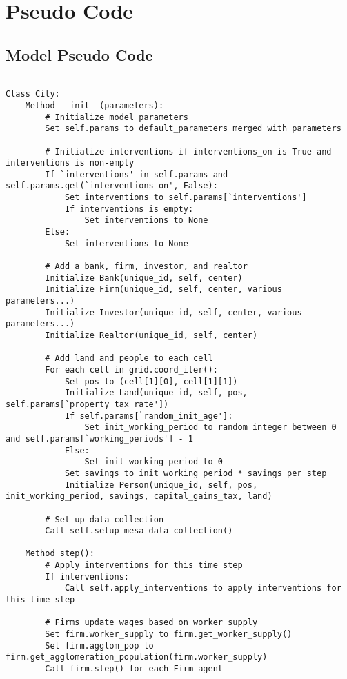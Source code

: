 \chapter{Pseudo Code} \label{appendix-pseudocode}
\section{Model Pseudo Code}
{\tiny\begin{verbatim} 

Class City:
    Method __init__(parameters):
        # Initialize model parameters
        Set self.params to default_parameters merged with parameters

        # Initialize interventions if interventions_on is True and interventions is non-empty
        If `interventions' in self.params and self.params.get(`interventions_on', False):
            Set interventions to self.params[`interventions']
            If interventions is empty:
                Set interventions to None
        Else:
            Set interventions to None

        # Add a bank, firm, investor, and realtor
        Initialize Bank(unique_id, self, center)
        Initialize Firm(unique_id, self, center, various parameters...)
        Initialize Investor(unique_id, self, center, various parameters...)
        Initialize Realtor(unique_id, self, center)

        # Add land and people to each cell
        For each cell in grid.coord_iter():
            Set pos to (cell[1][0], cell[1][1])
            Initialize Land(unique_id, self, pos, self.params[`property_tax_rate'])
            If self.params[`random_init_age']:
                Set init_working_period to random integer between 0 and self.params[`working_periods'] - 1
            Else:
                Set init_working_period to 0
            Set savings to init_working_period * savings_per_step
            Initialize Person(unique_id, self, pos, init_working_period, savings, capital_gains_tax, land)

        # Set up data collection
        Call self.setup_mesa_data_collection()

    Method step():
        # Apply interventions for this time step
        If interventions:
            Call self.apply_interventions to apply interventions for this time step

        # Firms update wages based on worker supply
        Set firm.worker_supply to firm.get_worker_supply()
        Set firm.agglom_pop to firm.get_agglomeration_population(firm.worker_supply)
        Call firm.step() for each Firm agent


\end{verbatim}}
